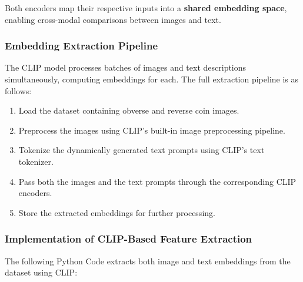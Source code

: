 \documentclass[nolibertine, english, algorithm, nomencl, minted]{ttlab-qualify}
\begin{document}
Both encoders map their respective inputs into a \textbf{shared embedding space}, enabling cross-modal comparisons 
between images and text.

\subsubsection{Embedding Extraction Pipeline}

The CLIP model processes batches of images and text descriptions simultaneously, 
computing embeddings for each. The full extraction pipeline is as follows:

\begin{enumerate}
    \item Load the dataset containing obverse and reverse coin images.
    \item Preprocess the images using CLIP’s built-in image preprocessing pipeline.
    \item Tokenize the dynamically generated text prompts using CLIP’s text tokenizer.
    \item Pass both the images and the text prompts through the corresponding CLIP encoders.
    \item Store the extracted embeddings for further processing.
\end{enumerate}

\subsubsection{Implementation of CLIP-Based Feature Extraction}

The following Python Code extracts both image and text embeddings from the dataset using CLIP:
\end{document}
